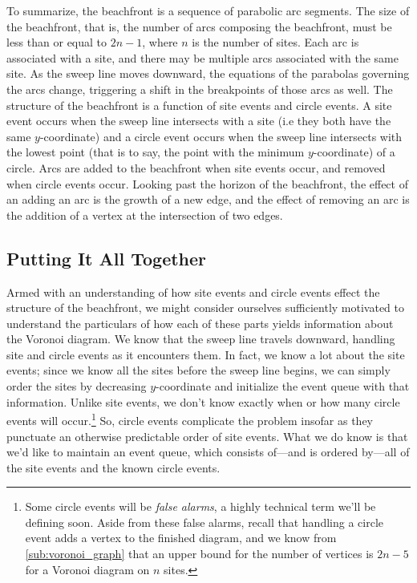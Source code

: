 \documentclass[12pt,twoside]{reedthesis}
\begin{document}
        To summarize, the beachfront is a sequence of parabolic arc segments. The size of the beachfront, that is, the number of arcs composing the beachfront, must be less than or equal to $2n-1$, where $n$ is the number of sites. Each arc is associated with a site, and there may be multiple arcs associated with the same site. As the sweep line moves downward, the equations of the parabolas governing the arcs change, triggering a shift in the breakpoints of those arcs as well. The structure of the beachfront is a function of site events and circle events. A site event occurs when the sweep line intersects with a site (i.e they both have the same $y$-coordinate) and a circle event occurs when the sweep line intersects with the lowest point (that is to say, the point with the minimum $y$-coordinate) of a circle. Arcs are added to the beachfront when site events occur, and removed when circle events occur. Looking past the horizon of the beachfront, the effect of an adding an arc is the growth of a new edge, and the effect of removing an arc is the addition of a vertex at the intersection of two edges.\par



    \subsection{Putting It All Together} %
    \label{sub:putting_it_all_together}

      Armed with an understanding of how site events and circle events effect the structure of the beachfront, we might consider ourselves sufficiently motivated to understand the particulars of how each of these parts yields information about the Voronoi diagram. We know that the sweep line travels downward, handling site and circle events as it encounters them. In fact, we know a lot about the site events; since we know all the sites before the sweep line begins, we can simply order the sites by decreasing $y$-coordinate and initialize the event queue with that information. Unlike site events, we don't know exactly when or how many circle events will occur.\footnote{Some circle events will be \emph{false alarms}, a highly technical term we'll be defining soon. Aside from these false alarms, recall that handling a circle event adds a vertex to the finished diagram, and we know from \cref{sub:voronoi_graph} that an upper bound for the number of vertices is $2n-5$ for a Voronoi diagram on $n$ sites.} So, circle events complicate the problem insofar as they punctuate an otherwise predictable order of site events. What we do know is that we'd like to maintain an event queue, which consists of---and is ordered by---all of the site events and the known circle events. \par
\end{document}
